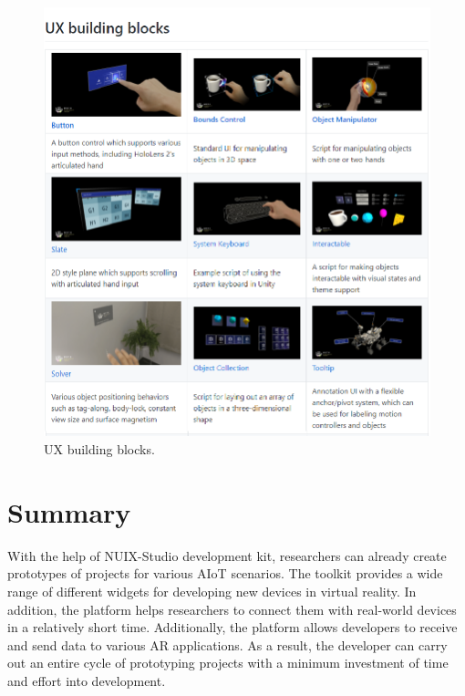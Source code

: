\begin{figure}
  \centering
  \includegraphics[width=0.6\linewidth]{figures/MRTK.png}
  \caption{UX building blocks.}
  \label{fig:MRTK-figure}
\end{figure}

\section{Summary}

With the help of NUIX-Studio development kit, researchers can already create prototypes of projects for various AIoT scenarios. The toolkit provides a wide range of different widgets for developing new devices in virtual reality. In addition, the platform helps researchers to connect them with real-world devices in a relatively short time. Additionally, the platform allows developers to receive and send data to various AR applications. As a result, the developer can carry out an entire cycle of prototyping projects with a minimum investment of time and effort into development.